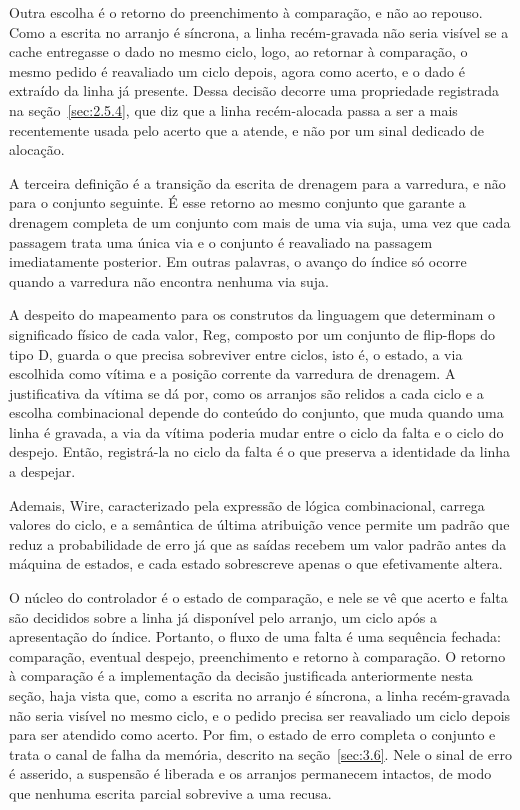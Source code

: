 Outra escolha é o retorno do preenchimento à comparação, e não ao repouso. Como a escrita no arranjo é síncrona, a linha recém-gravada não seria visível se a cache entregasse o dado no mesmo ciclo, logo, ao retornar à comparação, o mesmo pedido é reavaliado um ciclo depois, agora como acerto, e o dado é extraído da linha já presente. Dessa decisão decorre uma propriedade registrada na seção~\ref{sec:2.5.4}, que diz que a linha recém-alocada passa a ser a mais recentemente usada pelo acerto que a atende, e não por um sinal dedicado de alocação.

A terceira definição é a transição da escrita de drenagem para a varredura, e não para o conjunto seguinte. É esse retorno ao mesmo conjunto que garante a drenagem completa de um conjunto com mais de uma via suja, uma vez que cada passagem trata uma única via e o conjunto é reavaliado na passagem imediatamente posterior. Em outras palavras, o avanço do índice só ocorre quando a varredura não encontra nenhuma via suja.

A despeito do mapeamento para os construtos da linguagem que determinam o significado físico de cada valor, Reg, composto por um conjunto de flip-flops do tipo D, guarda o que precisa sobreviver entre ciclos, isto é, o estado, a via escolhida como vítima e a posição corrente da varredura de drenagem. A justificativa da vítima se dá por, como os arranjos são relidos a cada ciclo e a escolha combinacional depende do conteúdo do conjunto, que muda quando uma linha é gravada, a via da vítima poderia mudar entre o ciclo da falta e o ciclo do despejo. Então, registrá-la no ciclo da falta é o que preserva a identidade da linha a despejar.

Ademais, Wire, caracterizado pela expressão de lógica combinacional, carrega valores do ciclo, e a semântica de última atribuição vence permite um padrão que reduz a probabilidade de erro já que as saídas recebem um valor padrão antes da máquina de estados, e cada estado sobrescreve apenas o que efetivamente altera.

O núcleo do controlador é o estado de comparação, e nele se vê que acerto e falta são decididos sobre a linha já disponível pelo arranjo, um ciclo após a apresentação do índice. Portanto, o fluxo de uma falta é uma sequência fechada: comparação, eventual despejo, preenchimento e retorno à comparação. O retorno à comparação é a implementação da decisão justificada anteriormente nesta seção, haja vista que, como a escrita no arranjo é síncrona, a linha recém-gravada não seria visível no mesmo ciclo, e o pedido precisa ser reavaliado um ciclo depois para ser atendido como acerto. Por fim, o estado de erro completa o conjunto e trata o canal de falha da memória, descrito na seção~\ref{sec:3.6}. Nele o sinal de erro é asserido, a suspensão é liberada e os arranjos permanecem intactos, de modo que nenhuma escrita parcial sobrevive a uma recusa.

